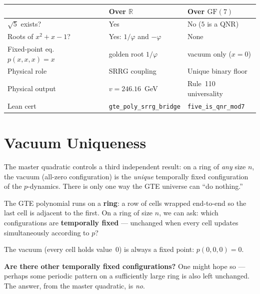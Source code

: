 \documentclass[11pt,a4paper]{article}
\newcommand{\term}[1]{\textbf{#1}}
\newcommand{\lean}[1]{\texttt{#1}}
\begin{document}
\medskip
\begin{center}
\begin{tabular}{lll}
\toprule
& \textbf{Over $\mathbb{R}$} & \textbf{Over $\mathrm{GF}(7)$} \\
\midrule
$\sqrt{5}$ exists? & Yes & No ($5$ is a QNR) \\
Roots of $x^2+x-1$? & Yes: $1/\varphi$ and $-\varphi$ & None \\
Fixed-point eq.\ $p(x,x,x)=x$ & golden root $1/\varphi$ & vacuum only ($x=0$) \\
Physical role & SRRG coupling & Unique binary floor \\
Physical output & $v = 246.16$~GeV & Rule~110 universality \\
Lean cert & \lean{gte\_poly\_srrg\_bridge} & \lean{five\_is\_qnr\_mod7} \\
\bottomrule
\end{tabular}
\end{center}

\section{Vacuum Uniqueness}
\label{sec:vacuum}

\begin{tcolorbox}[colback=boxblue,colframe=blue!40!black,
  title=A third result from the same quadratic]
The master quadratic controls a third independent result: on a ring of
\emph{any} size $n$, the vacuum (all-zero configuration) is the
\emph{unique} temporally fixed configuration of the $p$-dynamics.
There is only one way the GTE universe can ``do nothing.''
\end{tcolorbox}

The GTE polynomial runs on a \term{ring}: a row of cells wrapped end-to-end
so the last cell is adjacent to the first.  On a ring of size $n$,
we can ask: which configurations are \term{temporally fixed} — unchanged
when every cell updates simultaneously according to $p$?

The vacuum (every cell holds value~0) is always a fixed point: $p(0,0,0) = 0$.

\medskip\noindent\textbf{Are there other temporally fixed configurations?}
One might hope so — perhaps some periodic pattern on a sufficiently large
ring is also left unchanged.  The answer, from the master quadratic, is
\emph{no}.
\end{document}
